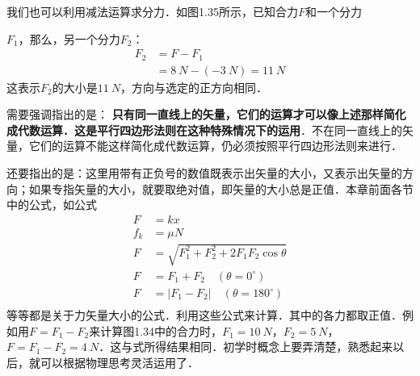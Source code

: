 我们也可以利用减法运算求分力．如图1.35所示，已知合力$F$和一个分力
\begin{figure}[H]
    \centering
    \caption{}
\end{figure}
$F_1$，那么，另一个分力$F_2$：
\begin{equation}
    \begin{aligned}
        F_2 & =F-F_1                                \\
            & =\qty{8}{N}-(-\qty{3}{N})=\qty{11}{N}
    \end{aligned}
\end{equation}
这表示$F_2$的大小是$\qty{11}{N}$，方向与选定的正方向相同．

需要强调指出的是：\textbf{ 只有同一直线上的矢量，它们的运算才可以像上述那样简化成代数运算．这是平行四边形法则在这种特殊情况下的运用}．不在同一直线上的矢量，它们的运算不能这样简化成代数运算，仍必须按照平行四边形法则来进行．



还要指出的是：这里用带有正负号的数值既表示出矢量的大小，又表示出矢量的方向；如果专指矢量的大小，就要取绝对值，即矢量的大小总是正值．本章前面各节中的公式，如公式
\begin{equation*}
    \begin{aligned}
        F   & =kx                                               \\
        f_k & =\mu N                                            \\
        F   & =\sqrt{F^2_1+F^2_2+2F_1F_2\cos\theta}             \\
        F   & =F_1+F_2\quad (\theta =0^\circ)                   \\
        F   & =\left| F_1-F_2 \right| \quad (\theta =180^\circ) \\
    \end{aligned}
\end{equation*}
等等都是关于力矢量大小的公式．利用这些公式来计算．其中的各力都取正值．例如用$F=F_1-F_2$来计算图1.34中的合力时，$F_1=\qty{10}{N}$，$F_2=\qty{5}{N}$，$F=F_1-F_2=\qty{4}{N}$．这与式所得结果相同．初学时概念上要弄清楚，熟悉起来以后，就可以根据物理思考灵活运用了．

